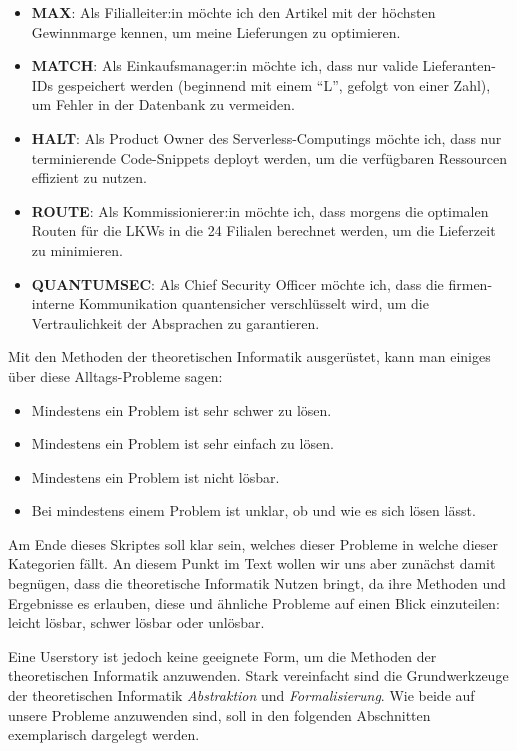 \begin{itemize}
    \item \textbf{MAX}: Als Filialleiter:in möchte ich den Artikel mit der höchsten Gewinnmarge
        kennen, um meine Lieferungen zu optimieren.
    \item \textbf{MATCH}: Als Einkaufsmanager:in möchte ich,
        dass nur valide Lieferanten-IDs gespeichert werden
        (beginnend mit einem ``L'', gefolgt von einer Zahl),
        um Fehler in der Datenbank zu vermeiden.
    \item \textbf{HALT}: Als Product Owner des Serverless-Computings möchte ich,
        dass nur terminierende Code-Snippets deployt werden,
        um die verfügbaren Ressourcen effizient zu nutzen.
    \item \textbf{ROUTE}: Als Kommissionierer:in möchte ich,
        dass morgens die optimalen Routen für die LKWs in die 24 Filialen berechnet werden,
        um die Lieferzeit zu minimieren.
    \item \textbf{QUANTUMSEC}: Als Chief Security Officer möchte ich,
        dass die firmen-interne Kommunikation quantensicher verschlüsselt wird,
        um die Vertraulichkeit der Absprachen zu garantieren.
\end{itemize}

Mit den Methoden der theoretischen Informatik ausgerüstet,
kann man einiges über diese Alltags-Probleme sagen:
\begin{itemize}
    \item Mindestens ein Problem ist sehr schwer zu lösen.
    \item Mindestens ein Problem ist sehr einfach zu lösen.
    \item Mindestens ein Problem ist nicht lösbar.
    \item Bei mindestens einem Problem ist unklar, ob und wie es sich lösen lässt.
\end{itemize}

Am Ende dieses Skriptes soll klar sein, welches dieser Probleme in welche dieser Kategorien fällt.
An diesem Punkt im Text wollen wir uns aber zunächst damit begnügen,
dass die theoretische Informatik Nutzen bringt,
da ihre Methoden und Ergebnisse es erlauben,
diese und ähnliche Probleme auf einen Blick einzuteilen:
leicht lösbar, schwer lösbar oder unlösbar.

Eine Userstory ist jedoch keine geeignete Form,
um die Methoden der theoretischen Informatik anzuwenden.
Stark vereinfacht sind die Grundwerkzeuge der theoretischen Informatik
\emph{Abstraktion} und \emph{Formalisierung}.
Wie beide auf unsere Probleme anzuwenden sind,
soll in den folgenden Abschnitten exemplarisch dargelegt werden.

